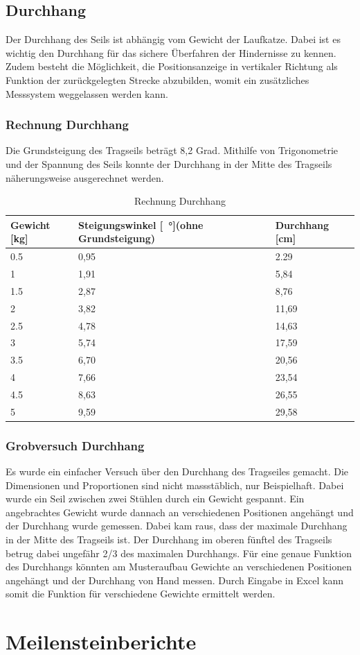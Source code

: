 \documentclass[a4paper]{report}
\begin{document}
\section{Durchhang}
\label{app:sec:Durchhang}
Der Durchhang des Seils ist abhängig vom Gewicht der Laufkatze. Dabei ist es wichtig den Durchhang für das sichere Überfahren der Hindernisse zu kennen. Zudem besteht die Möglichkeit, die Positionsanzeige in vertikaler Richtung als Funktion der zurückgelegten Strecke abzubilden, womit ein zusätzliches Messsystem weggelassen werden kann.

\subsection{Rechnung Durchhang}
\label{ssec:RechDurch}
Die Grundsteigung des Tragseils beträgt 8,2 Grad. Mithilfe von Trigonometrie und der Spannung des Seils konnte der Durchhang in der Mitte des Tragseils näherungsweise ausgerechnet werden.

\vspace{1em}
\noindent
\begin{table}[h!]
	\begin{tabular}{|p{}|p{}|p{}|}
		\hline
		\textbf{Gewicht [kg]} & \textbf{Steigungswinkel [\SI{}{\degree}](ohne Grundsteigung)} &\textbf{Durchhang [cm]}\\
		\hline
		0.5&0,95&2.29\\
		\hline
		1&1,91&5,84\\
		\hline
		1.5&2,87&8,76\\
		\hline
		2&3,82&11,69\\
		\hline
		2.5&4,78&14,63\\
		\hline
		3&5,74&17,59\\
		\hline
		3.5&6,70&20,56\\
		\hline
		4&7,66&23,54\\
		\hline
		4.5&8,63&26,55\\
		\hline
		5&9,59&29,58\\
		\hline
	\end{tabular}
	\caption{Rechnung Durchhang}
	\label{tbl:DurchhangRechnung}
\end{table}


\subsection{Grobversuch Durchhang}
\label{app:ssec:GrobeversDurch}
Es wurde ein einfacher Versuch über den Durchhang des Tragseiles gemacht. Die Dimensionen und Proportionen sind nicht massstäblich, nur Beispielhaft. Dabei wurde ein Seil zwischen zwei Stühlen durch ein Gewicht gespannt. Ein angebrachtes Gewicht wurde dannach an verschiedenen Positionen angehängt und der Durchhang wurde gemessen. Dabei kam raus, dass der maximale Durchhang in der Mitte des Tragseils ist. Der Durchhang im oberen fünftel des Tragseils betrug dabei ungefähr 2/3 des maximalen Durchhangs.
Für eine genaue Funktion des Durchhangs könnten am Musteraufbau Gewichte an verschiedenen Positionen angehängt und der Durchhang von Hand messen. Durch Eingabe in Excel kann somit die Funktion für verschiedene Gewichte ermittelt werden.

\chapter{Meilensteinberichte}
\label{app:ch:MeilensteinBerichte}


\end{document}
